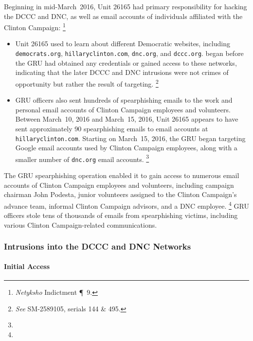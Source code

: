 Beginning in mid-March~2016, Unit 26165 had primary responsibility for hacking the DCCC and DNC, as well as email accounts of individuals affiliated with the Clinton Campaign:%
\footnote{\textit{Netyksho} Indictment \P~9.}

\begin{itemize}
    \item Unit 26165 used  to learn about  different Democratic websites, including \verb+democrats.org+, \verb+hillaryclinton.com+, \verb+dnc.org+, and \verb+dccc.org+.
     began before the GRU had obtained any credentials or gained access to these networks,  indicating that the later DCCC and DNC intrusions were not crimes of opportunity but rather the result of targeting.%
    \footnote{\textit{See} SM-2589105, serials 144 \& 495.}
    \item GRU officers also sent hundreds of spearphishing emails to the work and personal email accounts of Clinton Campaign employees and volunteers.
    Between March~10, 2016 and March~15, 2016, Unit 26165 appears to have sent approximately 90 spearphishing emails to email accounts at \verb+hillaryclinton.com+.
    Starting on March~15, 2016, the GRU began targeting Google email accounts used by Clinton Campaign employees, along with a smaller number of \verb+dnc.org+ email accounts.%
    \footnote{}
\end{itemize}

The GRU spearphishing operation enabled it to gain access to numerous email accounts of Clinton Campaign employees and volunteers, including campaign chairman John Podesta, junior volunteers assigned to the Clinton Campaign's advance team, informal Clinton Campaign advisors, and a DNC employee.%
\footnote{}
GRU officers stole tens of thousands of emails from spearphishing victims, including various Clinton Campaign-related communications.

\subsubsection{Intrusions into the DCCC and DNC Networks}

\paragraph{Initial Access}

